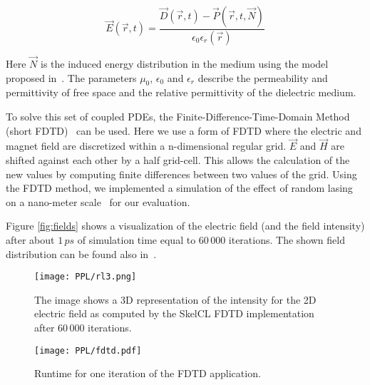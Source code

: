 \begin{equation}
\vec{E}\left(\vec{r}, t\right) = \frac{\vec{D}\left(\vec{r}, t\right) - \vec{P}\left(\vec{r}, t, \vec{N}\right)}{\epsilon_0\epsilon_r\left(\vec{r}\right)}
\label{eq:flussdichte}
\end{equation}

\noindent
Here $\vec{N}$ is the induced energy distribution in the medium using the model proposed in~\cite{Jiang2000}.
The parameters $\mu_0$, $\epsilon_0$ and $\epsilon_r$ describe the permeability and permittivity of free space and the relative permittivity of the dielectric medium.

To solve this set of coupled PDEs, the Finite-Difference-Time-Domain Method (short FDTD)~\cite{Yee1966} can be used.
Here we use a form of FDTD where the electric and magnet field are discretized within a n-dimensional regular grid.
$\vec{E}$ and $\vec{H}$ are shifted against each other by a half grid-cell.
This allows the calculation of the new values by computing finite differences between two values of the grid.
Using the FDTD method, we implemented a simulation of the effect of random lasing on a nano-meter scale~\cite{Cao1999} for our evaluation.

Figure \ref{fig:fields} shows a visualization of the electric field (and the field intensity) after about  $1\,ps$ of simulation time equal to $60\,000$ iterations.
The shown field distribution can be found also in~\cite{Cao2000, Sebbah2002, Yamilov2005}.%

\begin{figure}[t]
	\begin{minipage}[b]{.48\textwidth}
    \centering
	  \texttt{[image: PPL/rl3.png]}
  	\caption{\small The image shows a 3D representation of the intensity for the 2D electric field as computed by the SkelCL FDTD implementation after $60\,000$ iterations.}
	  \label{fig:fields}
  \end{minipage}
  \hspace{.02\textwidth}
  \begin{minipage}[b]{.48\textwidth}
    \centering
	  \texttt{[image: PPL/fdtd.pdf]}
  	\caption{\small Runtime for one iteration of the FDTD application.}
  	\label{fig:fdtd_eval}
  \end{minipage}
  \bigskip
\end{figure}

